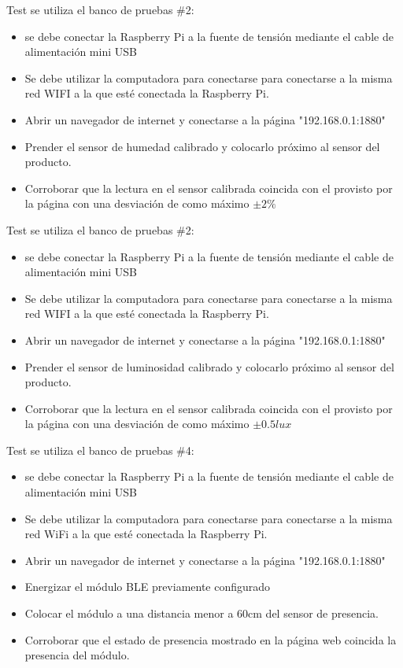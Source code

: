 Test \TBC se utiliza el banco de pruebas \#2:
\begin{itemize}
\item se debe conectar la Raspberry Pi a la fuente de tensión mediante el cable de alimentación mini USB
\item Se debe utilizar la computadora para conectarse para conectarse a la misma red WIFI a la que esté conectada la Raspberry Pi.
\item Abrir un navegador de internet y conectarse a la página "192.168.0.1:1880"
\item Prender el sensor de humedad calibrado y colocarlo próximo al sensor del producto.
\item Corroborar que la lectura en el sensor calibrada coincida con el provisto por la página con una desviación de como máximo  $ \pm  2\%	 $
\end{itemize}

Test \TBC se utiliza el banco de pruebas \#2:
\begin{itemize}
\item se debe conectar la Raspberry Pi a la fuente de tensión mediante el cable de alimentación mini USB
\item Se debe utilizar la computadora para conectarse para conectarse a la misma red WIFI a la que esté conectada la Raspberry Pi.
\item Abrir un navegador de internet y conectarse a la página "192.168.0.1:1880"
\item Prender el sensor de luminosidad calibrado y colocarlo próximo al sensor del producto.
\item Corroborar que la lectura en el sensor calibrada coincida con el provisto por la página con una desviación de como máximo  $ \pm 0.5 lux	 $
\end{itemize}


Test \TBC se utiliza el banco de pruebas \#4:
\begin{itemize}
\item se debe conectar la Raspberry Pi a la fuente de tensión mediante el cable de alimentación mini USB
\item Se debe utilizar la computadora para conectarse para conectarse a la misma red WiFi a la que esté conectada la Raspberry Pi.
\item Abrir un navegador de internet y conectarse a la página "192.168.0.1:1880"
\item Energizar el módulo BLE previamente configurado
\item Colocar el módulo a una distancia menor a 60cm del sensor de presencia.
\item Corroborar que el estado de presencia mostrado en la página web coincida la presencia del módulo.
\end{itemize}

